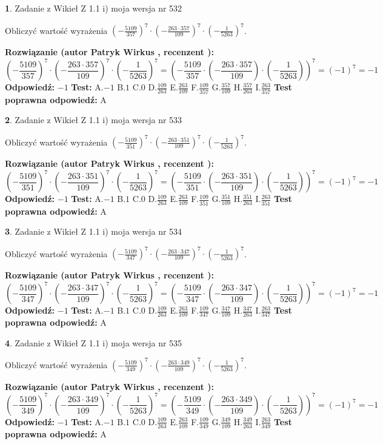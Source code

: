 \documentclass[12pt, a4paper]{article}
\theoremstyle{definition} %
\newtheorem{zad}{}
\newcommand{\zadStart}[1]{\begin{zad}#1\newline}
\newcommand{\zadStop}{\end{zad}}
\newcommand{\rozwStart}[2]{\noindent \textbf{Rozwiązanie (autor #1 , recenzent #2): }\newline}
\newcommand{\rozwStop}{\newline}
\newcommand{\odpStart}{\noindent \textbf{Odpowiedź:}\newline}
\newcommand{\odpStop}{\newline}
\newcommand{\testStart}{\noindent \textbf{Test:}\newline}
\newcommand{\testStop}{\newline}
\newcommand{\kluczStart}{\noindent \textbf{Test poprawna odpowiedź:}\newline}
\newcommand{\kluczStop}{\newline}
\begin{document}
\zadStart{Zadanie z Wikieł Z 1.1 i) moja wersja nr 532}

Obliczyć wartość wyrażenia $(-\frac{5109}{357})^{7} \cdot (-\frac{263 \cdot 357}{109})^{7} \cdot (-\frac{1}{5263})^{7}$.
\zadStop
\rozwStart{Patryk Wirkus}{}
$$(-\frac{5109}{357})^{7} \cdot (-\frac{263 \cdot 357}{109})^{7} \cdot (-\frac{1}{5263})^{7} = (-\frac{5109}{357} \cdot (-\frac{263 \cdot 357}{109}) \cdot (-\frac{1}{5263}))^{7} = (-1)^{7} = -1$$
\rozwStop
\odpStart
$-1$
\odpStop
\testStart
A.$-1$ B.$1$ C.$0$ D.$\frac{109}{263}$ E.$\frac{263}{109}$
F.$\frac{109}{357}$ G.$\frac{357}{109}$
H.$\frac{357}{263}$
I.$\frac{263}{357}$
\testStop
\kluczStart
A
\kluczStop



\zadStart{Zadanie z Wikieł Z 1.1 i) moja wersja nr 533}

Obliczyć wartość wyrażenia $(-\frac{5109}{351})^{7} \cdot (-\frac{263 \cdot 351}{109})^{7} \cdot (-\frac{1}{5263})^{7}$.
\zadStop
\rozwStart{Patryk Wirkus}{}
$$(-\frac{5109}{351})^{7} \cdot (-\frac{263 \cdot 351}{109})^{7} \cdot (-\frac{1}{5263})^{7} = (-\frac{5109}{351} \cdot (-\frac{263 \cdot 351}{109}) \cdot (-\frac{1}{5263}))^{7} = (-1)^{7} = -1$$
\rozwStop
\odpStart
$-1$
\odpStop
\testStart
A.$-1$ B.$1$ C.$0$ D.$\frac{109}{263}$ E.$\frac{263}{109}$
F.$\frac{109}{351}$ G.$\frac{351}{109}$
H.$\frac{351}{263}$
I.$\frac{263}{351}$
\testStop
\kluczStart
A
\kluczStop



\zadStart{Zadanie z Wikieł Z 1.1 i) moja wersja nr 534}

Obliczyć wartość wyrażenia $(-\frac{5109}{347})^{7} \cdot (-\frac{263 \cdot 347}{109})^{7} \cdot (-\frac{1}{5263})^{7}$.
\zadStop
\rozwStart{Patryk Wirkus}{}
$$(-\frac{5109}{347})^{7} \cdot (-\frac{263 \cdot 347}{109})^{7} \cdot (-\frac{1}{5263})^{7} = (-\frac{5109}{347} \cdot (-\frac{263 \cdot 347}{109}) \cdot (-\frac{1}{5263}))^{7} = (-1)^{7} = -1$$
\rozwStop
\odpStart
$-1$
\odpStop
\testStart
A.$-1$ B.$1$ C.$0$ D.$\frac{109}{263}$ E.$\frac{263}{109}$
F.$\frac{109}{347}$ G.$\frac{347}{109}$
H.$\frac{347}{263}$
I.$\frac{263}{347}$
\testStop
\kluczStart
A
\kluczStop



\zadStart{Zadanie z Wikieł Z 1.1 i) moja wersja nr 535}

Obliczyć wartość wyrażenia $(-\frac{5109}{349})^{7} \cdot (-\frac{263 \cdot 349}{109})^{7} \cdot (-\frac{1}{5263})^{7}$.
\zadStop
\rozwStart{Patryk Wirkus}{}
$$(-\frac{5109}{349})^{7} \cdot (-\frac{263 \cdot 349}{109})^{7} \cdot (-\frac{1}{5263})^{7} = (-\frac{5109}{349} \cdot (-\frac{263 \cdot 349}{109}) \cdot (-\frac{1}{5263}))^{7} = (-1)^{7} = -1$$
\rozwStop
\odpStart
$-1$
\odpStop
\testStart
A.$-1$ B.$1$ C.$0$ D.$\frac{109}{263}$ E.$\frac{263}{109}$
F.$\frac{109}{349}$ G.$\frac{349}{109}$
H.$\frac{349}{263}$
I.$\frac{263}{349}$
\testStop
\kluczStart
A
\kluczStop
\end{document}
